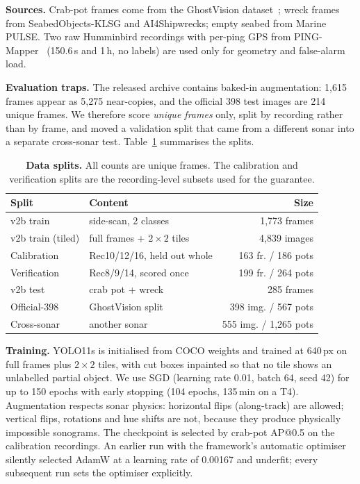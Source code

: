 \documentclass[10pt,twocolumn,letterpaper]{article}
\begin{document}
\textbf{Sources.} Crab-pot frames come from the GhostVision dataset~\cite{ghostvision};
wreck frames from SeabedObjects-KLSG and AI4Shipwrecks; empty seabed from
Marine PULSE. Two raw Humminbird recordings with per-ping GPS from
PING-Mapper~\cite{pingmapper} (150.6\,s and 1\,h, no labels) are used only for
geometry and false-alarm load.

\textbf{Evaluation traps.} The released archive contains baked-in augmentation:
1{,}615 frames appear as 5{,}275 near-copies, and the official 398 test images
are 214 unique frames. We therefore score \emph{unique frames} only, split by
recording rather than by frame, and moved a validation split that came from a
different sonar into a separate cross-sonar test. Table~\ref{tab:splits}
summarises the splits.

\begin{table}[t]
\centering\small
\setlength{\tabcolsep}{3pt}
\begin{tabular}{@{}llr@{}}
\toprule
Split & Content & Size \\
\midrule
v2b train & side-scan, 2 classes & 1{,}773 frames \\
v2b train (tiled) & full frames + $2\times2$ tiles & 4{,}839 images \\
Calibration & Rec10/12/16, held out whole & 163 fr. / 186 pots \\
Verification & Rec8/9/14, scored once & 199 fr. / 264 pots \\
v2b test & crab pot + wreck & 285 frames \\
Official-398 & GhostVision split & 398 img. / 567 pots \\
Cross-sonar & another sonar & 555 img. / 1{,}265 pots \\
\bottomrule
\end{tabular}
\caption{\textbf{Data splits.} All counts are unique frames. The calibration
and verification splits are the recording-level subsets used for the guarantee.}
\label{tab:splits}
\end{table}

\textbf{Training.} YOLO11s is initialised from COCO weights and trained at
640\,px on full frames plus $2\times2$ tiles, with cut boxes inpainted so that no
tile shows an unlabelled partial object. We use SGD (learning rate 0.01, batch
64, seed 42) for up to 150 epochs with early stopping (104 epochs, 135\,min on a
T4). Augmentation respects sonar physics: horizontal flips (along-track) are
allowed; vertical flips, rotations and hue shifts are not, because they produce
physically impossible sonograms. The checkpoint is selected by crab-pot AP@0.5 on
the calibration recordings. An earlier run with the framework's automatic
optimiser silently selected AdamW at a learning rate of 0.00167 and underfit;
every subsequent run sets the optimiser explicitly.
\end{document}
